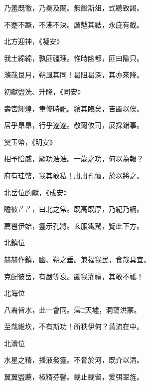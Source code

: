 \begin{pinyinscope}
 乃羞既徹，乃奏及闋。無餕斯俎，式聽致謁。



 不蹇不蹶，不沸不決。厲魃其祛，永庇有截。



 北方迎神，《凝安》



 我土綿綿，孰匪疆理。惟時幽都，匪曰隃只。



 滌哉艮月，朔風其同！曷阻曷深，其亦來降。



 初獻盥洗、升降，《同安》



 壽宮輝煌，聿修時祀。繽其臨矣，吉蠲以俟。



 居乎昂昂，行乎遂遂。敬爾攸司，展採錯事。



 奠玉幣，《明安》



 相予陰威，厥功浩浩。一歲之功，何以為報？



 府有珪幣，我其敢私！肅肅孔懷，於以將之。



 北岳位酌獻，《成安》



 瞻彼芒芒，曰北之常。既高既厚，乃紀乃綱。



 薦鬯伊始，靈示孔將。玄服鐵駕，覽此下方。



 北鎮位



 赫赫作鎮，幽、朔之垂。兼福我民，食哉具宜。



 克配彼岳，有嚴等衰。蠲我灌禮，其敢不祗！



 北海位



 八裔皆水，此一會同。澐□天墟，洞蕩洪蒙。



 至哉維坎，不有斯功！所秩伊何？黃流在中。



 北瀆位



 水星之精，播液發靈。不脅於河，既介以清。



 翼翼盥薦，椒糈芬馨。載止載留，爰弭翠旌。




\end{pinyinscope}
